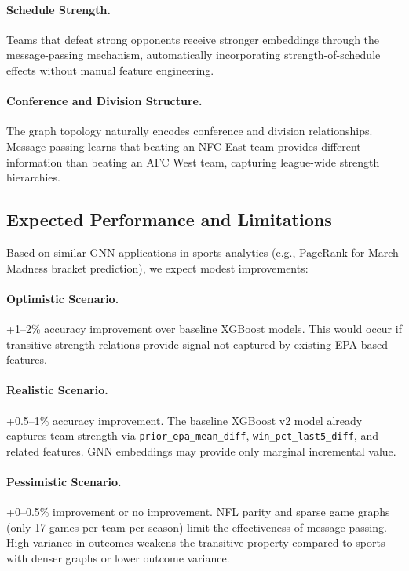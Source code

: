 \documentclass[12pt]{report}  %
\numberwithin{equation}{section}
\theoremstyle{plain}
\theoremstyle{definition}
\theoremstyle{remark}
\begin{document}
\paragraph{Schedule Strength.}
Teams that defeat strong opponents receive stronger embeddings through the message-passing mechanism, automatically incorporating strength-of-schedule effects without manual feature engineering.

\paragraph{Conference and Division Structure.}
The graph topology naturally encodes conference and division relationships. Message passing learns that beating an NFC East team provides different information than beating an AFC West team, capturing league-wide strength hierarchies.

\subsection{Expected Performance and Limitations}
Based on similar GNN applications in sports analytics (e.g., PageRank for March Madness bracket prediction), we expect modest improvements:

\paragraph{Optimistic Scenario.}
+1--2\% accuracy improvement over baseline XGBoost models. This would occur if transitive strength relations provide signal not captured by existing EPA-based features.

\paragraph{Realistic Scenario.}
+0.5--1\% accuracy improvement. The baseline XGBoost v2 model already captures team strength via \texttt{prior\_epa\_mean\_diff}, \texttt{win\_pct\_last5\_diff}, and related features. GNN embeddings may provide only marginal incremental value.

\paragraph{Pessimistic Scenario.}
+0--0.5\% improvement or no improvement. NFL parity and sparse game graphs (only 17 games per team per season) limit the effectiveness of message passing. High variance in outcomes weakens the transitive property compared to sports with denser graphs or lower outcome variance.
\end{document}
